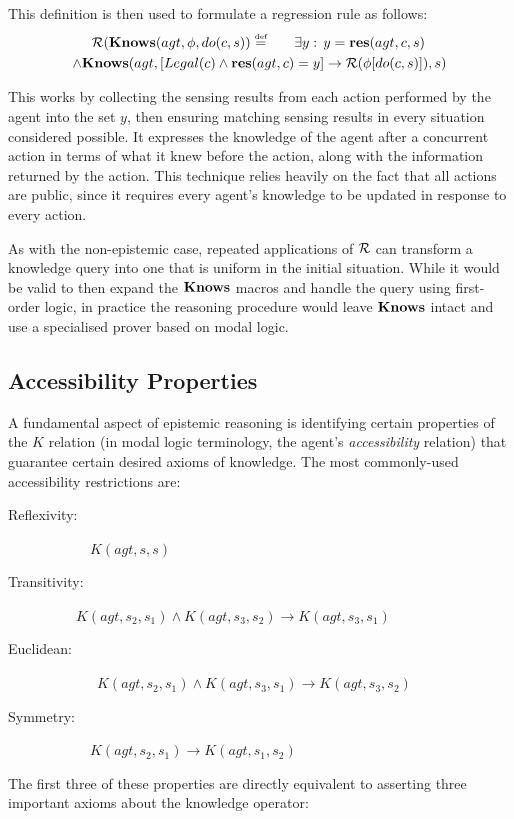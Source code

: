 This definition is then used to formulate a regression rule as follows:\begin{multline}
\mathcal{R}(\mathbf{Knows}(agt,\phi,do(c,s))\stackrel{\mbox{\tiny def}}{=}\,\,\,\,\,\,\,\,\,\,\exists y:\, y=\mathbf{res}(agt,c,s)\,\\
\wedge\mathbf{Knows}(agt,\left[Legal(c)\wedge\mathbf{res}(agt,c)=y\right]\rightarrow\mathcal{R}(\phi[do(c,s)]),s)\label{eq:reg_k_std}\end{multline}


This works by collecting the sensing results from each action performed
by the agent into the set $y$, then ensuring matching sensing results
in every situation considered possible. It expresses the knowledge
of the agent after a concurrent action in terms of what it knew before
the action, along with the information returned by the action. This
technique relies heavily on the fact that all actions are public,
since it requires every agent's knowledge to be updated in response
to every action.

As with the non-epistemic case, repeated applications of $\mathcal{R}$ can
transform a knowledge query into one that is uniform in the initial
situation. While it would be valid to then expand the $\mathbf{Knows}$ macros
and handle the query using first-order logic, in practice the reasoning
procedure would leave $\mathbf{Knows}$ intact and use a specialised prover
based on modal logic.


\subsection{Accessibility Properties\label{sec:Knowledge:Accessibility-Properties}}

A fundamental aspect of epistemic reasoning is identifying certain
properties of the $K$ relation (in modal logic terminology, the agent's
\emph{accessibility} relation) that guarantee certain desired axioms
of knowledge. The most commonly-used accessibility restrictions are:

\begin{description}
\item [{{{{{{{{{{{{{{{Reflexivity:}}}}}}}}}}}}}}}] ~~~~~~$K(agt,s,s)$ 
\item [{{{{{{{{{{{{{{{Transitivity:}}}}}}}}}}}}}}}] ~~~~$K(agt,s_{2},s_{1})\wedge K(agt,s_{3},s_{2})\rightarrow K(agt,s_{3},s_{1})$ 
\item [{{{{{{{{{{{{{{{Euclidean:}}}}}}}}}}}}}}}] ~~~~~~~$K(agt,s_{2},s_{1})\wedge K(agt,s_{3},s_{1})\rightarrow K(agt,s_{3},s_{2})$ 
\item [{{{{{{{{{{{{{{{Symmetry:}}}}}}}}}}}}}}}] ~~~~~~$K(agt,s_{2},s_{1})\rightarrow K(agt,s_{1},s_{2})$ 
\end{description}
The first three of these properties are directly equivalent to asserting
three important axioms about the knowledge operator:


